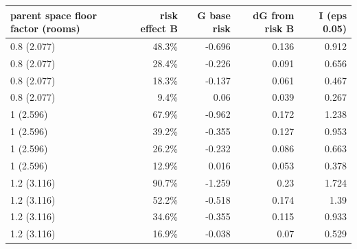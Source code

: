 \begin{tabular}{lrrrr}
\toprule
parent space floor factor (rooms) & risk effect B & G base risk & dG from risk B & I (eps 0.05) \\
\midrule
0.8 (2.077) & 48.3\% & -0.696 & 0.136 & 0.912 \\
0.8 (2.077) & 28.4\% & -0.226 & 0.091 & 0.656 \\
0.8 (2.077) & 18.3\% & -0.137 & 0.061 & 0.467 \\
0.8 (2.077) & 9.4\% & 0.06 & 0.039 & 0.267 \\
1 (2.596) & 67.9\% & -0.962 & 0.172 & 1.238 \\
1 (2.596) & 39.2\% & -0.355 & 0.127 & 0.953 \\
1 (2.596) & 26.2\% & -0.232 & 0.086 & 0.663 \\
1 (2.596) & 12.9\% & 0.016 & 0.053 & 0.378 \\
1.2 (3.116) & 90.7\% & -1.259 & 0.23 & 1.724 \\
1.2 (3.116) & 52.2\% & -0.518 & 0.174 & 1.39 \\
1.2 (3.116) & 34.6\% & -0.355 & 0.115 & 0.933 \\
1.2 (3.116) & 16.9\% & -0.038 & 0.07 & 0.529 \\
\bottomrule
\end{tabular}

